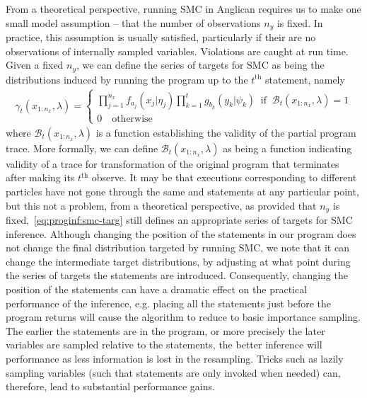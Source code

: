 From a theoretical perspective, running SMC in Anglican
requires us to make one small model assumption -- that the number of observations $n_y$ is fixed.  In
practice, this assumption is usually satisfied, particularly if their are no observations of
internally sampled variables.  Violations are caught at run time.  Given
a fixed $n_y$, we can define the series of targets for SMC as being the distributions
induced by running the program up to the $t^{\text{th}}$ \observe statement, namely
\begin{align}
\label{eq:proginf:smc-targ}
\gamma_t(x_{1:n_x}, \lambda) = \begin{cases}
\prod_{j=1}^{n_x} 
f_{a_j}(x_j | \eta_j)
\prod_{k=1}^{t}
g_{b_k}(y_k | \psi_k) \;\; \text{if} \;\; \mathcal{B}_t(x_{1:n_x},\lambda)=1 \\
0 \quad \text{otherwise}
\end{cases}
\end{align}
where $\mathcal{B}_t(x_{1:n_x},\lambda)$ is a function establishing the validity of the 
partial program trace.  More formally, we can define $\mathcal{B}_t(x_{1:n_x},\lambda)$ as
being a function indicating validity of a trace for transformation of the original program
that terminates after making its $t^{\text{th}}$ observe.
It may be that executions corresponding to different particles have not gone through the 
same \sample and \observe statements at any particular point, but this not a problem, from a theoretical perspective,
as provided that $n_y$ is fixed,~\eqref{eq:proginf:smc-targ} still defines an appropriate
series of targets for SMC inference.
Although changing the position of the \observe statements in
our program does not change the final distribution targeted by running SMC, we note that it can change
the intermediate target distributions, by adjusting at what point during the series of targets
the \sample statements are introduced.  Consequently, changing the position of the \observe
statements can have a dramatic effect on the practical performance of the inference, e.g.
placing all the \observe statements just before the program returns will cause the algorithm
to reduce to basic importance sampling.  The earlier the \observe statements are in the program,
or more precisely the later variables are sampled relative to the \observe statements, the
better inference will performance as less information is lost in
the resampling.  Tricks such as lazily sampling variables (such that \sample statements
are only invoked when needed) can, therefore, lead to substantial
performance gains.

